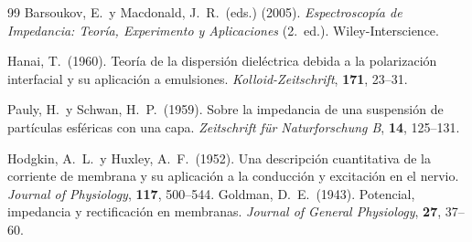 \documentclass[12pt]{article}
\begin{document}
\begin{thebibliography}{99}
Barsoukov, E.\ y Macdonald, J.\ R.\ (eds.) (2005).
\textit{Espectroscop\'ia de Impedancia: Teor\'ia, Experimento y Aplicaciones}
(2.\textordfeminine~ed.).
Wiley-Interscience.

Hanai, T.\ (1960).
Teor\'ia de la dispersi\'on diel\'ectrica debida a la polarizaci\'on interfacial y su
aplicaci\'on a emulsiones.
\textit{Kolloid-Zeitschrift}, \textbf{171}, 23--31.


Pauly, H.\ y Schwan, H.\ P.\ (1959).
Sobre la impedancia de una suspensi\'on de part\'iculas esf\'ericas con una capa.
\textit{Zeitschrift f\"{u}r Naturforschung B}, \textbf{14}, 125--131.

Hodgkin, A.\ L.\ y Huxley, A.\ F.\ (1952).
Una descripci\'on cuantitativa de la corriente de membrana y su aplicaci\'on a la conducci\'on
y excitaci\'on en el nervio.
\textit{Journal of Physiology}, \textbf{117}, 500--544.
Goldman, D.\ E.\ (1943).
Potencial, impedancia y rectificaci\'on en membranas.
\textit{Journal of General Physiology}, \textbf{27}, 37--60.
\end{thebibliography}

\end{document}
